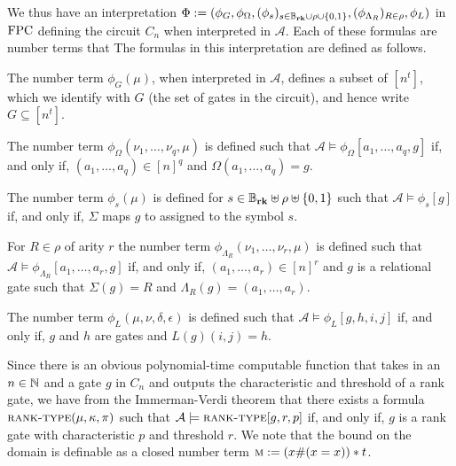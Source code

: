 \documentclass[../paper.tex]{subfiles}
\begin{document}
We thus have an interpretation $\Phi := (\phi_G, \phi_\Omega, (\phi_s)_{ s \in
  \mathbb{B}_{\text{\textbf{rk}}} \cup \rho \cup \{0,1\}}, (\phi_{\Lambda_R})_{R \in \rho}, \phi_L)$ in
$\text{\upshape FPC}$ defining the circuit $C_n$ when interpreted in $\mathcal{A}$. Each of
these formulas are number terms that The formulas in this interpretation are
defined as follows.

\begin{myitemize}
\item The number term $\phi_G(\mu)$, when interpreted in $\mathcal{A}$, defines
  a subset of $[n^t]$, which we identify with $G$ (the set of gates in the
  circuit), and hence write $G \subseteq [n^t]$.
\item The number term $\phi_{\Omega}(\nu_1, \ldots , \nu_q, \mu)$ is defined
  such that $\mathcal{A} \models \phi_\Omega[a_1, \ldots, a_q, g]$ if, and only
  if, $(a_1, \ldots, a_q) \in [n]^q$ and $\Omega(a_1, \ldots, a_q) = g$.
\item The number term $\phi_s (\mu)$ is defined for $s \in \mathbb{B}_{\text{\textbf{rk}}} \uplus \rho
  \uplus \{0,1\}$ such that $\mathcal{A} \models \phi_s [g]$ if, and only if,
  $\Sigma$ maps $g$ to assigned to the symbol $s$.
	      	      
\item For $R \in \rho$ of arity $r$ the number term $\phi_{\Lambda_R}(\nu_1,
  \ldots, \nu_r, \mu)$ is defined such that $\mathcal{A} \models
  \phi_{\Lambda_R} [a_1, \ldots, a_r, g]$ if, and only if, $(a_1, \ldots,
  a_r)\in [n]^r$ and $g$ is a relational gate such that $\Sigma (g) = R$ and
  $\Lambda_R (g) = (a_1, \ldots, a_r)$.
\item The number term $\phi_L(\mu, \nu, \delta, \epsilon)$ is defined such that
  $\mathcal{A} \models \phi_L[g,h,i,j]$ if, and only if, $g$ and $h$ are gates
  and $L(g)(i,j) = h$.
\end{myitemize}

Since there is an obvious polynomial-time computable function that takes in an
$n \in \mathbb{N}$ and a gate $g$ in $C_n$ and outputs the characteristic and
threshold of a rank gate, we have from the Immerman-Verdi theorem that there
exists a formula $\textsc{rank-type}(\mu, \kappa , \pi)$ such that $\mathcal{A}
\models \textsc{rank-type}[g, r, p]$ if, and only if, $g$ is a rank gate with
characteristic $p$ and threshold $r$. We note that the bound on the domain is
definable as a closed number term $\textsc{m} := (x\# (x = x))*t$.
\end{document}
